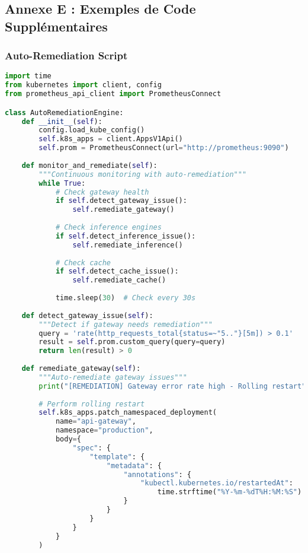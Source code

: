 \documentclass[12pt,a4paper]{article}
\begin{document}
\newpage
\subsection{Annexe E : Exemples de Code Supplémentaires}

\subsubsection{Auto-Remediation Script}

\begin{lstlisting}[language=python, caption=Auto-Remediation Engine]
import time
from kubernetes import client, config
from prometheus_api_client import PrometheusConnect

class AutoRemediationEngine:
    def __init__(self):
        config.load_kube_config()
        self.k8s_apps = client.AppsV1Api()
        self.prom = PrometheusConnect(url="http://prometheus:9090")
        
    def monitor_and_remediate(self):
        """Continuous monitoring with auto-remediation"""
        while True:
            # Check gateway health
            if self.detect_gateway_issue():
                self.remediate_gateway()
            
            # Check inference engines
            if self.detect_inference_issue():
                self.remediate_inference()
            
            # Check cache
            if self.detect_cache_issue():
                self.remediate_cache()
            
            time.sleep(30)  # Check every 30s
    
    def detect_gateway_issue(self):
        """Detect if gateway needs remediation"""
        query = 'rate(http_requests_total{status=~"5.."}[5m]) > 0.1'
        result = self.prom.custom_query(query=query)
        return len(result) > 0
    
    def remediate_gateway(self):
        """Auto-remediate gateway issues"""
        print("[REMEDIATION] Gateway error rate high - Rolling restart")
        
        # Perform rolling restart
        self.k8s_apps.patch_namespaced_deployment(
            name="api-gateway",
            namespace="production",
            body={
                "spec": {
                    "template": {
                        "metadata": {
                            "annotations": {
                                "kubectl.kubernetes.io/restartedAt": 
                                    time.strftime("%Y-%m-%dT%H:%M:%S")
                            }
                        }
                    }
                }
            }
        )
        

\end{lstlisting}
\end{document}
